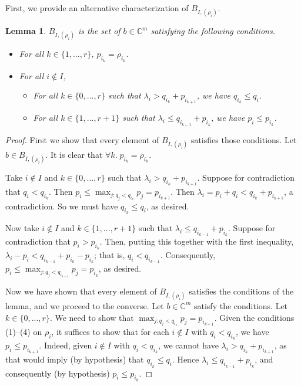 \documentclass[12pt,psamsfonts]{article}
\newtheorem{lemma}[theorem]{Lemma}
\begin{document}
\par First, we provide an alternative characterization of \(B_{I, (\rho_i)}\).
\begin{lemma}\label{alternative_bs_one}
    \(B_{I, (\rho_i)}\) is the set of \(b \in \mathbb{C}^m\) satisfying the following conditions.
    \begin{itemize}
        \item For all \(k \in \{1, ..., r\}\), \(p_{i_k} = \rho_{i_k}\).
        \item For all \(i \notin I\),
        \begin{itemize}
            \item For all \(k \in \{0, ..., r\}\) such that \(\lambda_i > q_{i_k} + p_{i_{k + 1}}\), we have \(q_{i_k} \leq q_i\).
            \item For all \(k \in \{1, ..., r + 1\}\) such that \(\lambda_i \leq q_{i_{k - 1}} + p_{i_k}\), we have \(p_i \leq p_{i_k}\).
        \end{itemize}
    \end{itemize}
\end{lemma}
\begin{proof}
    First we show that every element of \(B_{I, (\rho_i)}\) satisfies those conditions.
    Let \(b \in B_{I, (\rho_i)}\).
    It is clear that \(\forall k. \; p_{i_k} = \rho_{i_k}\).
    \par Take \(i \notin I\) and \(k \in \{0, ..., r\}\) such that \(\lambda_i > q_{i_k} + p_{i_{k + 1}}\).
    Suppose for contradiction that \(q_i < q_{i_k}\).
    Then \(p_i \leq \max_{j : q_j < q_{i_k}} p_j = p_{i_{k + 1}}\).
    Then \(\lambda_i = p_i + q_i < q_{i_k} + p_{i_{k + 1}}\), a contradiction.
    So we must have \(q_{i_k} \leq q_i\), as desired.
    \par Now take \(i \notin I\) and \(k \in \{1, ..., r + 1\}\) such that \(\lambda_i \leq q_{i_{k - 1}} + p_{i_k}\).
    Suppose for contradiction that \(p_i > p_{i_k}\).
    Then, putting this together with the first inequality, \(\lambda_i - p_i < q_{i_{k - 1}} + p_{i_k} - p_{i_k}\); that is, \(q_i < q_{i_{k - 1}}\).
    Consequently, \(p_i \leq \max_{j : q_j < q_{i_{k - 1}}} p_j = p_{i_k}\), as desired.
    \par Now we have shown that every element of \(B_{I, (\rho_i)}\) satisfies the conditions of the lemma, and we proceed to the converse.
    Let \(b \in \mathbb{C}^m\) satisfy the conditions.
    Let \(k \in \{0, ..., r\}\).
    We need to show that \(\max_{j : q_j < q_{i_k}} p_j = p_{i_{k + 1}}\).
    Given the conditions (1)--(4) on \(\rho_i\), it suffices to show that for each \(i \notin I\) with \(q_i < q_{i_k}\), we have \(p_i \leq p_{i_{k + 1}}\).
    Indeed, given \(i \notin I\) with \(q_i < q_{i_k}\), we cannot have \(\lambda_i > q_{i_k} + p_{i_{k + 1}}\), as that would imply (by hypothesis) that \(q_{i_k} \leq q_i\).
    Hence \(\lambda_i \leq q_{i_{k - 1}} + p_{i_k}\), and consequently (by hypothesis) \(p_i \leq p_{i_k}\).
\end{proof}
\end{document}
